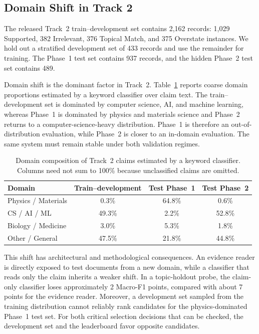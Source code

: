 \documentclass[runningheads]{llncs}
\newcommand{\mf}{Macro-F1}
\newcommand{\lab}[1]{\textsf{\small #1}}
\newcommand{\best}[1]{#1}
\begin{document}
\subsection{Domain Shift in Track 2}
The released Track~2 train--development set contains 2,162 records: 1,029 \lab{Supported}, 382 \lab{Irrelevant}, 376 \lab{Topical Match}, and 375 \lab{Overstate} instances. We hold out a stratified development set of 433 records and use the remainder for training. The Phase~1 test set contains 937 records, and the hidden Phase~2 test set contains 489.

Domain shift is the dominant factor in Track~2. Table~\ref{tab:t2-domains} reports coarse domain proportions estimated by a keyword classifier over claim text. The train--development set is dominated by computer science, AI, and machine learning, whereas Phase~1 is dominated by physics and materials science and Phase~2 returns to a computer-science-heavy distribution. Phase~1 is therefore an out-of-distribution evaluation, while Phase~2 is closer to an in-domain evaluation. The same system must remain stable under both validation regimes.

\begin{table}[t]
\centering
\caption{Domain composition of Track~2 claims estimated by a keyword classifier. Columns need not sum to 100\% because unclassified claims are omitted.}
\label{tab:t2-domains}
\small
\begin{tabular}{lccc}
\toprule
Domain & Train--development & Test Phase~1 & Test Phase~2\\
\midrule
Physics / Materials & 0.3\% & \best{64.8\%} & 0.6\%\\
CS / AI / ML & \best{49.3\%} & 2.2\% & \best{52.8\%}\\
Biology / Medicine & 3.0\% & 5.3\% & 1.8\%\\
Other / General & 47.5\% & 21.8\% & 44.8\%\\
\bottomrule
\end{tabular}
\end{table}

This shift has architectural and methodological consequences. An evidence reader is directly exposed to test documents from a new domain, while a classifier that reads only the claim inherits a weaker shift. In a topic-holdout probe, the claim-only classifier loses approximately 2 \mf{} points, compared with about 7 points for the evidence reader. Moreover, a development set sampled from the training distribution cannot reliably rank candidates for the physics-dominated Phase~1 test set. For both critical selection decisions that can be checked, the development set and the leaderboard favor opposite candidates.
\end{document}
